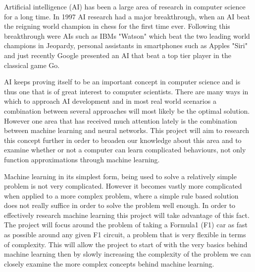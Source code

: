 
Artificial intelligence (AI) has been a large area of research in computer science for a long time. In 1997 AI research had a major breakthrough, when an AI beat the reigning world champion in chess for the first time ever. Following this breakthrough were AIs such as IBMs "Watson" which beat the two leading world champions in Jeopardy, personal assistants in smartphones such as Apples "Siri" and just recently Google presented an AI that beat a top tier player in the classical game Go.


AI keeps proving itself to be an important concept in computer science and is thus one that is of great interest to computer scientists. There are many ways in which to approach AI development and in most real world scenarios a combination between several approaches will most likely be the optimal solution. However one area that has received much attention lately is the combination between machine learning and neural networks. This project will aim to research this concept further in order to broaden our knowledge about this area and to examine whether or not a computer can learn complicated behaviours, not only function approximations through machine learning. %

Machine learning in its simplest form, being used to solve a relatively simple problem is not very complicated. However it becomes vastly more complicated when applied to a more complex problem, where a simple rule based solution does not really suffice in order to solve the problem well enough. In order to effectively research machine learning this project will take advantage of this fact. The project will focus around the problem of taking a Formula1 (F1) car as fast as possible around any given F1 circuit, a problem that is very flexible in terms of complexity. This will allow the project to start of with the very basics behind machine learning then by slowly increasing the complexity of the problem we can closely examine the more complex concepts behind machine learning.

